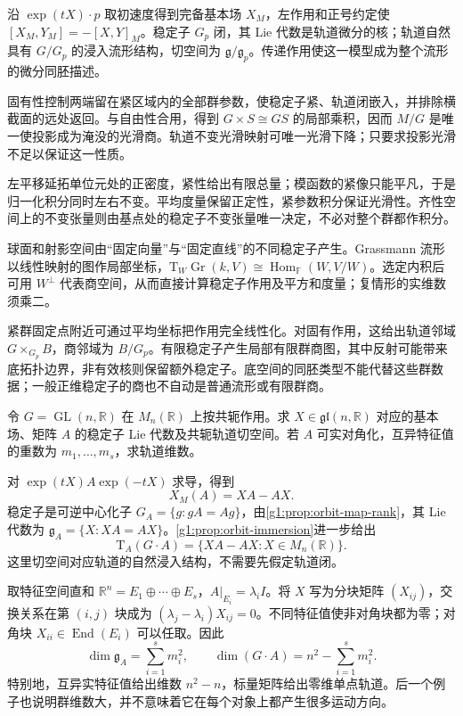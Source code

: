 \begin{chaptersummary}
	沿 \(\exp(tX)\cdot p\) 取初速度得到完备基本场 \(X_M\)，左作用和正号约定使 \([X_M,Y_M]=-[X,Y]_M\)。稳定子 \(G_p\) 闭，其 Lie 代数是轨道微分的核；轨道自然具有 \(G/G_p\) 的浸入流形结构，切空间为 \(\mathfrak g/\mathfrak g_p\)。传递作用使这一模型成为整个流形的微分同胚描述。

	\ProseParagraphBreak

	固有性控制两端留在紧区域内的全部群参数，使稳定子紧、轨道闭嵌入，并排除横截面的远处返回。与自由性合用，得到 \(G\times S\cong GS\) 的局部乘积，因而 \(M/G\) 是唯一使投影成为淹没的光滑商。轨道不变光滑映射可唯一光滑下降；只要求投影光滑不足以保证这一性质。

	\ProseParagraphBreak

	左平移延拓单位元处的正密度，紧性给出有限总量；模函数的紧像只能平凡，于是归一化积分同时左右不变。平均度量保留正定性，紧参数积分保证光滑性。齐性空间上的不变张量则由基点处的稳定子不变张量唯一决定，不必对整个群都作积分。

	\ProseParagraphBreak

	球面和射影空间由“固定向量”与“固定直线”的不同稳定子产生。Grassmann 流形以线性映射的图作局部坐标，\(\mathrm{T}_W\operatorname{Gr}(k,V)\cong\operatorname{Hom}_{\mathbb F}(W,V/W)\)。选定内积后可用 \(W^\perp\) 代表商空间，从而直接计算稳定子作用及平方和度量；复情形的实维数须乘二。

	\ProseParagraphBreak

	紧群固定点附近可通过平均坐标把作用完全线性化。对固有作用，这给出轨道邻域 \(G\times_{G_p}B\)，商邻域为 \(B/G_p\)。有限稳定子产生局部有限群商图，其中反射可能带来底拓扑边界，非有效核则保留额外稳定子。底空间的同胚类型不能代替这些群数据；一般正维稳定子的商也不自动是普通流形或有限群商。
\end{chaptersummary}

\BookExercises


\begin{exercise}\label{g1:ex:conjugation-orbit-dimension}
	令 \(G=\operatorname{GL}(n,\mathbb R)\) 在 \(M_n(\mathbb R)\) 上按共轭作用。求 \(X\in\mathfrak{gl}(n,\mathbb R)\) 对应的基本场、矩阵 \(A\) 的稳定子 Lie 代数及共轭轨道切空间。若 \(A\) 可实对角化，互异特征值的重数为 \(m_1,\ldots,m_s\)，求轨道维数。
\end{exercise}
\begin{solution}
	对 \(\exp(tX)A\exp(-tX)\) 求导，得到
	\[
		X_M(A)=XA-AX.
	\]
	稳定子是可逆中心化子 \(G_A=\{g:gA=Ag\}\)，由\cref{g1:prop:orbit-map-rank}，其 Lie 代数为 \(\mathfrak g_A=\{X:XA=AX\}\)。\cref{g1:prop:orbit-immersion}进一步给出
	\[
		\mathrm{T}_A(G\cdot A)=\{XA-AX:X\in M_n(\mathbb R)\}.
	\]
	这里切空间对应轨道的自然浸入结构，不需要先假定轨道闭。

	取特征空间直和 \(\mathbb R^n=E_1\oplus\cdots\oplus E_s\)，\(A|_{E_i}=\lambda_iI\)。将 \(X\) 写为分块矩阵 \((X_{ij})\)，交换关系在第 \((i,j)\) 块成为 \((\lambda_j-\lambda_i)X_{ij}=0\)。不同特征值使非对角块都为零；对角块 \(X_{ii}\in\operatorname{End}(E_i)\) 可以任取。因此
	\[
		\dim\mathfrak g_A=\sum_{i=1}^s m_i^2,
		\qquad \dim(G\cdot A)=n^2-\sum_{i=1}^s m_i^2.
	\]
	特别地，互异实特征值给出维数 \(n^2-n\)，标量矩阵给出零维单点轨道。后一个例子也说明群维数大，并不意味着它在每个对象上都产生很多运动方向。
\end{solution}

